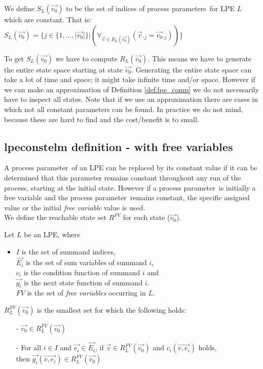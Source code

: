 \index{}\documentclass[a4paper,10pt]{article}
\theoremstyle{plain}
\theoremstyle{definition}
\newcommand{\ovr}{\overrightarrow}
\newcommand{\pp}{process parameter}
\newcommand{\pps}{process parameters}
\newcommand{\ti}{\textit}
\begin{document}
\begin{defn}\label{def:lpe_comp} We define $S_L(\ovr{v_0})$ to be the set of indices of \pps\ for LPE $L$ which are constant. That is:\\

$S_L(\ovr{v_0}) = \lbrace j \in  \lbrace 1, \ldots, \vert \ovr{v_0}\vert  \rbrace \vert (\forall_{\ovr{v} \in R_L(\ovr{v_0})}( \ovr{v}._j = \ovr{v_{0}}._j)) \rbrace $
\end{defn}

To get $S_L(\ovr{v_0})$ we have to compute $R_L(\ovr{v_0})$. This means we have to generate the entire state space starting at state $\ovr{v_0}$. Generating the entire state space can take a lot of time and space; it might take infinite time and/or space. However if we can make an approximation of Definition \ref{def:lpe_comp} we do not necessarily have to inspect all states. Note that if we use an approximation there are cases in which not all constant parameters can be found. In practice we do not mind, because these are hard to find and the cost/benefit is to small.

\subsection{lpeconstelm definition - with free variables}

A \pp\ of an LPE can be replaced by its constant value if it can be determined that this parameter remains constant throughout any run of the process, starting at the initial state. However if a \pp\ is initially a free variable and the \pp\ remains constant, the specific assigned value or the initial \ti{free variable} value is used.\\

We define the reachable state set $R^{FV}$ for each state ($\ovr{v_0}$). 
\begin{defn} Let $L$ be an LPE, where\begin{itemize}
\item $I$ is the set of summand indices, \\ $\ovr{E_i}$ is the set of sum variables of summand $i$, \\ $c_i$ is the condition function of summand $i$ and \\ $\ovr{g_i}$ is the next state function of summand $i$. \\
$FV$ is the set of \ti{free variables} occurring in $L$.\\
\end{itemize}

$R_L^{FV}(\ovr{v_0})$ is the smallest set for which the following holds:
  \begin{itemize}
    \item[-] $\ovr{v_0} \in R_L^{FV}(\ovr{v_0})$
    \item[-] For all $i \in I$ and $\ovr{e_i} \in \ovr{E_i}$, if $\ovr{v} \in R_L^{FV}(\ovr{v_0})$ and $c_i(\ovr{v, e_i})$ holds, \\ then $\ovr{g_i}(\ovr{v, e_i}) \in R_L^{FV}(\ovr{v_0})$ \\
   \end{itemize}
\end{defn}
\end{document}
